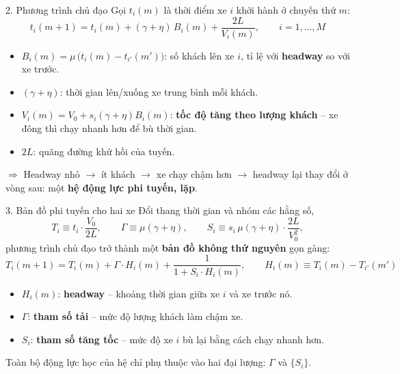 \documentclass[t, aspectratio=169]{beamer}
\begin{document}
\begin{frame}{2. Phương trình chủ đạo}
	Gọi $t_i(m)$ là thời điểm xe $i$ khởi hành ở chuyến thứ $m$:
	\begin{equation}
		t_i(m+1) = t_i(m) + (\gamma + \eta)\, B_i(m) + \frac{2L}{V_i(m)}, \qquad i = 1,\dots,M
	\end{equation}

	\vspace{0.3em}
	\begin{itemize}
		\item $B_i(m) = \mu\,\big(t_i(m) - t_{i'}(m')\big)$: số khách lên xe $i$, tỉ lệ với \textbf{headway} so với xe trước.
		\item $(\gamma+\eta)$: thời gian lên/xuống xe trung bình mỗi khách.
		\item $V_i(m) = V_0 + s_i (\gamma+\eta) B_i(m)$: \textbf{tốc độ tăng theo lượng khách} -- xe đông thì chạy nhanh hơn để bù thời gian.
		\item $2L$: quãng đường khứ hồi của tuyến.
	\end{itemize}

	\vspace{0.3em}
	$\Rightarrow$ Headway nhỏ $\to$ ít khách $\to$ xe chạy chậm hơn $\to$ headway lại thay đổi ở vòng sau: một \textbf{hệ động lực phi tuyến, lặp}.
\end{frame}

\begin{frame}{3. Bản đồ phi tuyến cho hai xe}
	Đổi thang thời gian và nhóm các hằng số,
	\[
		T_i \equiv t_i \cdot \frac{V_0}{2L}, \qquad
		\Gamma \equiv \mu(\gamma+\eta), \qquad
		S_i \equiv s_i\,\mu(\gamma+\eta)\cdot\frac{2L}{V_0^2},
	\]
	phương trình chủ đạo trở thành một \textbf{bản đồ không thứ nguyên} gọn gàng:
	\begin{equation}
		T_i(m+1) = T_i(m) + \Gamma \cdot H_i(m) + \frac{1}{1 + S_i \cdot H_i(m)},
		\qquad H_i(m) \equiv T_i(m) - T_{i'}(m')
	\end{equation}

	\begin{itemize}
		\item $H_i(m)$: \textbf{headway} -- khoảng thời gian giữa xe $i$ và xe trước nó.
		\item $\Gamma$: \textbf{tham số tải} -- mức độ lượng khách làm chậm xe.
		\item $S_i$: \textbf{tham số tăng tốc} -- mức độ xe $i$ bù lại bằng cách chạy nhanh hơn.
	\end{itemize}

	\alert{Toàn bộ động lực học của hệ chỉ phụ thuộc vào hai đại lượng: $\Gamma$ và $\{S_i\}$.}
\end{frame}
\end{document}
